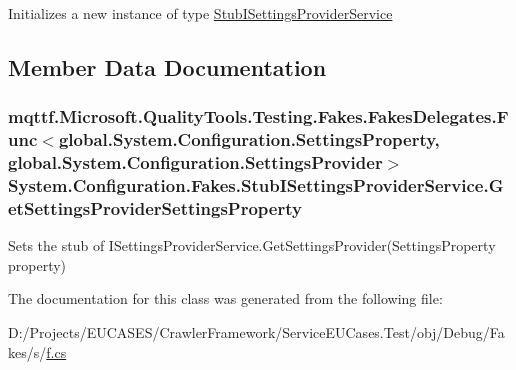 Initializes a new instance of type \hyperlink{class_system_1_1_configuration_1_1_fakes_1_1_stub_i_settings_provider_service}{Stub\-I\-Settings\-Provider\-Service}



\subsection{Member Data Documentation}
\hypertarget{class_system_1_1_configuration_1_1_fakes_1_1_stub_i_settings_provider_service_aaf5a586f4a774057fb846f2878623cd0}{
\subsubsection[{Get\-Settings\-Provider\-Settings\-Property}]{\setlength{\rightskip}{0pt plus 5cm}mqttf.\-Microsoft.\-Quality\-Tools.\-Testing.\-Fakes.\-Fakes\-Delegates.\-Func$<$global.\-System.\-Configuration.\-Settings\-Property, global.\-System.\-Configuration.\-Settings\-Provider$>$ System.\-Configuration.\-Fakes.\-Stub\-I\-Settings\-Provider\-Service.\-Get\-Settings\-Provider\-Settings\-Property}}\label{class_system_1_1_configuration_1_1_fakes_1_1_stub_i_settings_provider_service_aaf5a586f4a774057fb846f2878623cd0}


Sets the stub of I\-Settings\-Provider\-Service.\-Get\-Settings\-Provider(\-Settings\-Property property)



The documentation for this class was generated from the following file\-:\begin{DoxyCompactItemize}
\item 
D\-:/\-Projects/\-E\-U\-C\-A\-S\-E\-S/\-Crawler\-Framework/\-Service\-E\-U\-Cases.\-Test/obj/\-Debug/\-Fakes/s/\hyperlink{s_2f_8cs}{f.\-cs}\end{DoxyCompactItemize}
